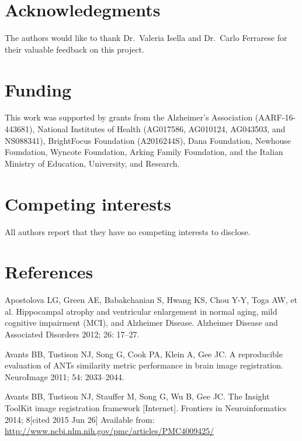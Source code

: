 \documentclass[]{article}
\begin{document}
\section*{Acknowledegments}\label{acknowledegments}

The authors would like to thank Dr.~Valeria Isella and Dr.~Carlo
Ferrarese for their valuable feedback on this project.

\section*{Funding}\label{funding}

This work was supported by grants from the Alzheimer's Association
(AARF-16-443681), National Institutes of Health (AG017586, AG010124,
AG043503, and NS088341), BrightFocus Foundation (A2016244S), Dana
Foundation, Newhouse Foundation, Wyncote Foundation, Arking Family
Foundation, and the Italian Ministry of Education, University, and
Research.

\section*{Competing interests}\label{competing-interests}

All authors report that they have no competing interests to disclose.

\section*{References}\label{references}

\hypertarget{refs}{}
\hypertarget{ref-apostolova_hippocampal_2012}{}
Apostolova LG, Green AE, Babakchanian S, Hwang KS, Chou Y-Y, Toga AW, et
al. Hippocampal atrophy and ventricular enlargement in normal aging,
mild cognitive impairment (MCI), and Alzheimer Disease. Alzheimer
Disease and Associated Disorders 2012; 26: 17--27.

\hypertarget{ref-avants_reproducible_2011}{}
Avants BB, Tustison NJ, Song G, Cook PA, Klein A, Gee JC. A reproducible
evaluation of ANTs similarity metric performance in brain image
registration. NeuroImage 2011; 54: 2033--2044.

\hypertarget{ref-avants_insight_2014}{}
Avants BB, Tustison NJ, Stauffer M, Song G, Wu B, Gee JC. The Insight
ToolKit image registration framework {[}Internet{]}. Frontiers in
Neuroinformatics 2014; 8{[}cited 2015 Jun 26{]} Available from:
\url{http://www.ncbi.nlm.nih.gov/pmc/articles/PMC4009425/}
\end{document}
